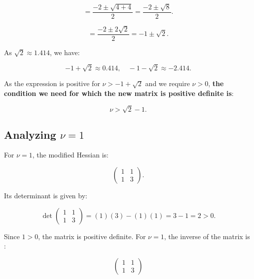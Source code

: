 \documentclass{article}
\begin{document}
\begin{equation}
= \frac{-2 \pm \sqrt{4 + 4}}{2} = \frac{-2 \pm \sqrt{8}}{2}.
\end{equation}

\begin{equation}
= \frac{-2 \pm 2\sqrt{2}}{2} = -1 \pm \sqrt{2}.
\end{equation}

As \( \sqrt{2} \approx 1.414 \), we have:

\begin{equation}
-1 + \sqrt{2} \approx 0.414, \quad -1 - \sqrt{2} \approx -2.414.
\end{equation}

As the expression is positive for \( \nu > -1 + \sqrt{2} \) and we require \( \nu > 0 \), \textbf{the condition we need for which the new matrix is positive definite is}:

\textbf{\begin{equation}
\nu > \sqrt{2} - 1.
\end{equation}}

\subsection{Analyzing \( \nu = 1 \)}

For \( \nu = 1 \), the modified Hessian is:

\begin{equation}
\begin{pmatrix}
1 & 1 \\
1 & 3
\end{pmatrix}.
\end{equation}

Its determinant is given by:

\begin{equation}
\det \begin{pmatrix} 1 & 1 \\ 1 & 3 \end{pmatrix} = (1)(3) - (1)(1) = 3 - 1 = 2 > 0.
\end{equation}

Since \( 1 > 0 \), the matrix is positive definite. For \( \nu = 1 \), the inverse of the matrix is :

\begin{equation}
\begin{pmatrix} 1 & 1 \\ 1 & 3 \end{pmatrix}
\end{equation}
\end{document}
